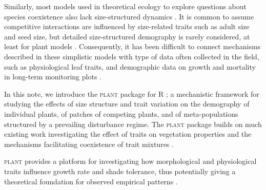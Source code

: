 \documentclass[a4paper,11pt]{article}
\newcommand{\plant}{\textsc{plant}}
\begin{document}
Similarly, most models used in theoretical ecology to explore
questions about species coexistence also lack size-structured dynamics
\citep[e.g.][]{Calcagno-2006, Geritz-1995, Leimar-2013,
  Levin-1974,MacArthur-1967,Tilman-1985}.  It is common to assume
competitive interactions are influenced by size-related traits such as
adult size and seed size, but detailed size-structured demography is
rarely considered, at least for plant models \cite[for animal
examples, see][]{Deroos-1988, Deroos-1992}. Consequently, it has been
difficult to connect mechanisms described in these simplistic models
with type of data often collected in the field, such as physiological
leaf traits, and demographic data on growth and mortality in long-term
monitoring plots \citep{Adler-2013}.

In this note, we introduce the {\plant} package for R \citep{R-2015};
a mechanistic framework for studying the effects of size structure and
trait variation on the demography of individual plants, of patches of
competing plants, and of meta-populations structured by a prevailing
disturbance regime.
%
The {\plant} package builds on much existing work investigating the
effect of traits on vegetation properties and the mechanisms
facilitating coexistence of trait mixtures
\citep{Kohyama-1993,Deroos-1997,Moorcroft-2001,Falster-2011,Falster-2015}.

{\plant} provides a platform for investigating how morphological and
physiological traits influence growth rate and shade tolerance, thus
potentially giving a theoretical foundation for observed empirical
patterns \citep{Wright-2010,Baltzer-2007}.
\end{document}
